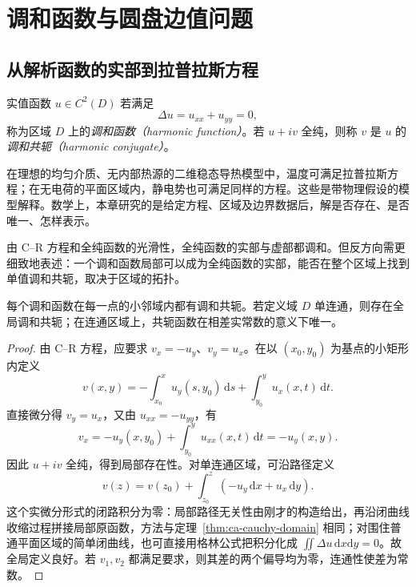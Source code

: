 \setcounter{chapter}{11} %
\chapter{调和函数与圆盘边值问题}
\label{chap:ca-harmonic}

\section{从解析函数的实部到拉普拉斯方程}

\begin{definition}[调和函数与调和共轭]
实值函数 $u\in C^2(D)$ 若满足
\begin{equation}
 \Delta u=u_{xx}+u_{yy}=0,
 \label{eq:ca-laplace}
\end{equation}
称为区域 $D$ 上的\emph{调和函数（harmonic function）}。若 $u+iv$ 全纯，则称 $v$ 是 $u$ 的\emph{调和共轭（harmonic conjugate）}。
\end{definition}

在理想的均匀介质、无内部热源的二维稳态导热模型中，温度可满足拉普拉斯方程；在无电荷的平面区域内，静电势也可满足同样的方程。这些是带物理假设的模型解释。数学上，本章研究的是给定方程、区域及边界数据后，解是否存在、是否唯一、怎样表示。

由 C--R 方程和全纯函数的光滑性，全纯函数的实部与虚部都调和。但反方向需更细致地表述：一个调和函数局部可以成为全纯函数的实部，能否在整个区域上找到单值调和共轭，取决于区域的拓扑。

\begin{theorem}[调和共轭的存在]
\label{thm:ca-conjugate}
每个调和函数在每一点的小邻域内都有调和共轭。若定义域 $D$ 单连通，则存在全局调和共轭；在连通区域上，共轭函数在相差实常数的意义下唯一。
\end{theorem}
\begin{proof}
由 C--R 方程，应要求 $v_x=-u_y$、$v_y=u_x$。在以 $(x_0,y_0)$ 为基点的小矩形内定义
\[
 v(x,y)=-\int_{x_0}^{x}u_y(s,y_0)\,\mathrm ds
 +\int_{y_0}^{y}u_x(x,t)\,\mathrm dt.
\]
直接微分得 $v_y=u_x$，又由 $u_{xx}=-u_{yy}$，有
\[
 v_x=-u_y(x,y_0)+\int_{y_0}^{y}u_{xx}(x,t)\,\mathrm dt
 =-u_y(x,y).
\]
因此 $u+iv$ 全纯，得到局部存在性。对单连通区域，可沿路径定义
\begin{equation}
 v(z)=v(z_0)+\int_{z_0}^{z}(-u_y\,\mathrm dx+u_x\,\mathrm dy).
 \label{eq:ca-conjugate-integral}
\end{equation}
这个实微分形式的闭路积分为零：局部路径无关性由刚才的构造给出，再沿闭曲线收缩过程拼接局部原函数，方法与定理~\ref{thm:ca-cauchy-domain} 相同；对围住普通平面区域的简单闭曲线，也可直接用格林公式把积分化成 $\iint\Delta u\,\mathrm dx\mathrm dy=0$。故全局定义良好。若 $v_1,v_2$ 都满足要求，则其差的两个偏导均为零，连通性使差为常数。
\end{proof}

